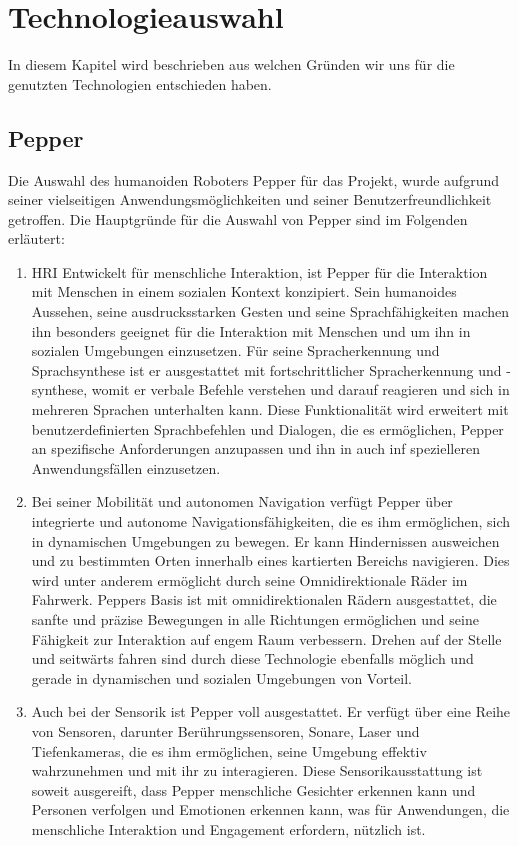 \chapter{Technologieauswahl}
In diesem Kapitel wird beschrieben aus welchen Gründen wir uns für die genutzten Technologien entschieden haben.
\section{Pepper}
Die Auswahl des humanoiden Roboters Pepper für das Projekt, wurde aufgrund seiner vielseitigen Anwendungsmöglichkeiten und seiner Benutzerfreundlichkeit getroffen. Die Hauptgründe für die Auswahl von Pepper sind im Folgenden erläutert:
\begin{enumerate}
    \item \ac{HRI} Entwickelt für menschliche Interaktion, ist Pepper für die Interaktion mit Menschen in einem sozialen Kontext konzipiert. Sein humanoides Aussehen, seine ausdrucksstarken Gesten und seine Sprachfähigkeiten machen ihn besonders geeignet für die Interaktion mit Menschen und um ihn in sozialen Umgebungen einzusetzen. Für seine Spracherkennung und Sprachsynthese ist er ausgestattet mit fortschrittlicher Spracherkennung und -synthese, womit er verbale Befehle verstehen und darauf reagieren und sich in mehreren Sprachen unterhalten kann. Diese Funktionalität wird erweitert mit benutzerdefinierten Sprachbefehlen und Dialogen, die es ermöglichen, Pepper an spezifische Anforderungen anzupassen und ihn in auch inf spezielleren Anwendungsfällen einzusetzen.
    \item Bei seiner Mobilität und autonomen Navigation verfügt Pepper über integrierte und autonome Navigationsfähigkeiten, die es ihm ermöglichen, sich in dynamischen Umgebungen zu bewegen. Er kann Hindernissen ausweichen und zu bestimmten Orten innerhalb eines kartierten Bereichs navigieren. Dies wird unter anderem ermöglicht durch seine Omnidirektionale Räder im Fahrwerk. Peppers Basis ist mit omnidirektionalen Rädern ausgestattet, die sanfte und präzise Bewegungen in alle Richtungen ermöglichen und seine Fähigkeit zur Interaktion auf engem Raum verbessern. Drehen auf der Stelle und seitwärts fahren sind durch diese Technologie ebenfalls möglich und gerade in dynamischen und sozialen Umgebungen von Vorteil.
    \item Auch bei der Sensorik ist Pepper voll ausgestattet. Er verfügt über eine Reihe von Sensoren, darunter Berührungssensoren, Sonare, Laser und Tiefenkameras, die es ihm ermöglichen, seine Umgebung effektiv wahrzunehmen und mit ihr zu interagieren. Diese Sensorikausstattung ist soweit ausgereift, dass Pepper menschliche Gesichter erkennen kann und Personen verfolgen und Emotionen erkennen kann, was für Anwendungen, die menschliche Interaktion und Engagement erfordern, nützlich ist.

\end{enumerate}
